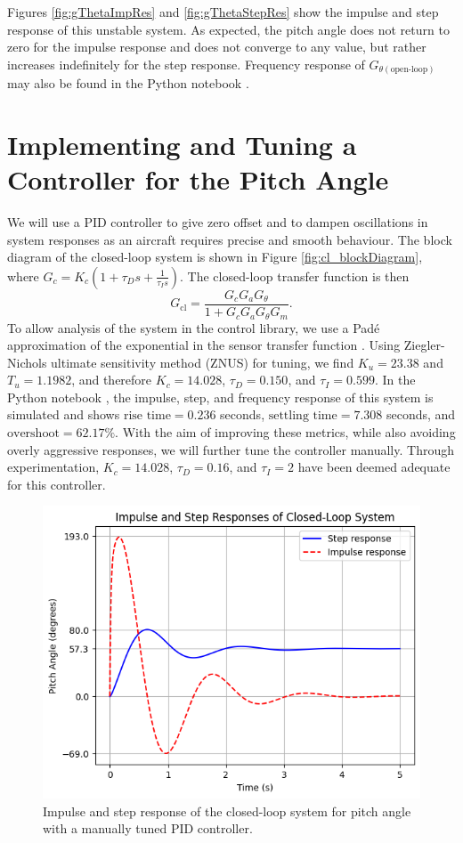 \documentclass[9pt,a4paper]{article}
\begin{document}
    
    Figures \ref{fig:gThetaImpRes} and \ref{fig:gThetaStepRes} show the impulse and step response of this unstable system. As expected, the pitch angle does not return to zero for the impulse response and does not converge to any value, but rather increases indefinitely for the step response. Frequency response of $G_{\theta(\text{open-loop})}$ may also be found in the Python notebook \cite{python_notebook}.

    \section{Implementing and Tuning a Controller for the Pitch Angle}
    We will use a PID controller to give zero offset and to dampen oscillations in system responses as an aircraft requires precise and smooth behaviour. The block diagram of the closed-loop system is shown in Figure \ref{fig:cl_blockDiagram}, where $G_{c}=K_{c}(1+\tau_{D}s+\frac{1}{\tau_{I}s})$. The closed-loop transfer function is then $$G_{\text{cl}}=\frac{G_cG_aG_\theta}{1+G_cG_aG_\theta G_m}.$$ To allow analysis of the system in the control library, we use a Padé approximation of the exponential in the sensor transfer function \cite[Section 9.4]{textbook}. Using Ziegler-Nichols ultimate sensitivity method (ZNUS) \cite[Section 10.3.3]{textbook} for tuning, we find $K_u=23.38$ and $T_u=1.1982$, and therefore $K_c=14.028$, $\tau_D=0.150$, and $\tau_I=0.599$. In the Python notebook \cite{python_notebook}, the impulse, step, and frequency response of this system is simulated and shows $\text{rise time}=0.236$ seconds, $\text{settling time}=7.308$ seconds, and $\text{overshoot}=62.17\%$. With the aim of improving these metrics, while also avoiding overly aggressive responses, we will further tune the controller manually. Through experimentation, $K_c=14.028$, $\tau_D=0.16$, and $\tau_I=2$ have been deemed adequate for this controller.

    \begin{figure}[!ht]
        \centering
        \includegraphics[width=0.35\linewidth]{figs/Fig3CLTFImpStep.png}
        \caption{Impulse and step response of the closed-loop system for pitch angle with a manually tuned PID controller.}
        \label{fig:3}
    \end{figure}
\end{document}
